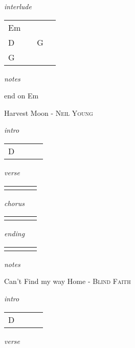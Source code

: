 \documentclass[12pt]{article}
\begin{document}
\textit{interlude}

\begin{tabular}{|P{1.25in}|P{1.25in}|P{1.25in}|P{1.25in}|}
  Em &   &   &   \\
  D &   & G  &   \\
  G &   &   &   \\
\end{tabular}

\textit{notes}

end on Em

\newpage


{\Huge Harvest Moon} {\huge - \textsc{Neil Young}}

\huge
\textit{intro}

\begin{tabular}{|P{1.25in}|P{1.25in}|P{1.25in}|P{1.25in}|}
  D &   &   &   \\
\end{tabular}

\textit{verse}

\begin{tabular}{|P{1.25in}|P{1.25in}|P{1.25in}|P{1.25in}|}
    &   &   &   \\
\end{tabular}

\textit{chorus}

\begin{tabular}{|P{1.25in}|P{1.25in}|P{1.25in}|P{1.25in}|}
    &   &   &   \\
\end{tabular}

\textit{ending}

\begin{tabular}{|P{1.25in}|P{1.25in}|P{1.25in}|P{1.25in}|}
    &   &   &   \\
\end{tabular}

\textit{notes}

\newpage

{\Huge Can't Find my way Home} {\huge - \textsc{Blind Faith}}

\huge
\textit{intro}

\begin{tabular}{|P{1.25in}|P{1.25in}|P{1.25in}|P{1.25in}|}
  D &   &   &   \\
\end{tabular}

\textit{verse}
\end{document}
